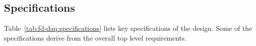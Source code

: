  
\subsection{Specifications}
\label{sec:fd-daq:specifications}

Table~\ref{tab:fd-daq:specifications} lists
key specifications of the  design.  Some of the
specifications derive from the overall   
top level requirements.




%

